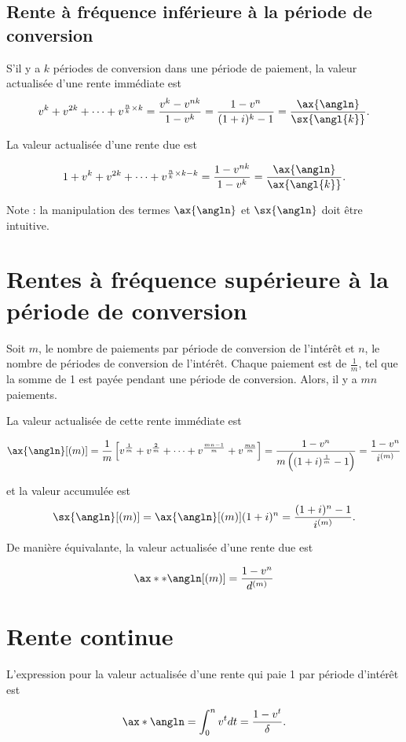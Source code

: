 \subsection{Rente à fréquence inférieure à la période de conversion}

S'il y a $k$ périodes de conversion dans une période de paiement, la valeur actualisée d'une rente immédiate est 
$$v^k + v^{2k} + \dots + v^{\frac{n}{k} \times k} = \frac{v^k - v^{nk}}{1 - v^{k}} = \frac{1 - v^n}{(1 + i)^k - 1} = \frac{\ax{\angln}}{\sx{\angl{k}}}.$$

La valeur actualisée d'une rente due est

$$1 + v^k + v^{2k} + \dots + v^{\frac{n}{k} \times k - k} = \frac{1 - v^{nk}}{1 - v^{k}} =  \frac{\ax{\angln}}{\ax{\angl{k}}}.$$

Note : la manipulation des termes $\ax{\angln}$ et $\sx{\angln}$ doit être intuitive. 

\section{Rentes à fréquence supérieure à la période de conversion}

Soit $m$, le nombre de paiements par période de conversion de l'intérêt et $n$, le nombre de périodes de conversion de l'intérêt. Chaque paiement est de $\frac{1}{m}$, tel que la somme de 1 est payée pendant une période de conversion. Alors, il y a $mn$ paiements. 

La valeur actualisée de cette rente immédiate est 

$$\ax{\angln}[(m)] = \frac{1}{m}\left[v^{\frac{1}{m}} + v^{\frac{2}{m}} + \dots + v^{\frac{mn-1}{m}} + v^{\frac{mn}{m}} \right]= \frac{1 - v^n}{m\left((1 + i)^{\frac{1}{m}} - 1\right)} = \frac{1-v^n}{i^{(m)}}$$

et la valeur accumulée est 
$$\sx{\angln}[(m)] = \ax{\angln}[(m)] (1 + i)^n = \frac{(1 + i)^n - 1}{i^{(m)}}.$$

De manière équivalante, la valeur actualisée d'une rente due est

$$\ax**{\angln}[(m)] = \frac{1-v^n}{d^{(m)}}$$

\section{Rente continue}

L'expression pour la valeur actualisée d'une rente qui paie 1 par période d'intérêt est 

$$\ax*{\angln} = \int_{0}^{n}v^t dt = \frac{1 - v^t}{\delta}.$$

